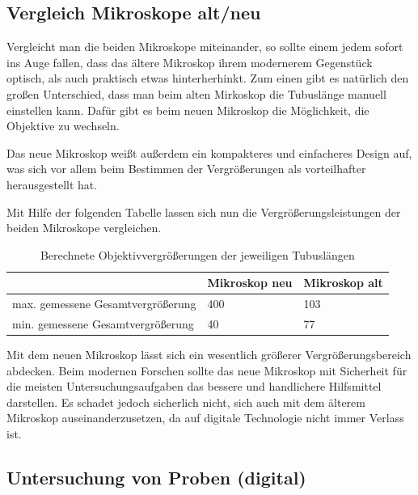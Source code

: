 \documentclass[12pt,a4paper,twoside]{article}
\begin{document}
\subsection{Vergleich Mikroskope alt/neu}

Vergleicht man die beiden Mikroskope miteinander, so sollte einem jedem sofort ins Auge fallen, dass das ältere Mikroskop ihrem modernerem Gegenstück optisch, als auch praktisch etwas hinterherhinkt.
Zum einen gibt es natürlich den großen Unterschied, dass man beim alten Mirkoskop die Tubuslänge manuell einstellen kann. Dafür gibt es beim neuen Mikroskop die Möglichkeit, die Objektive zu wechseln. \newline

\noindent
Das neue Mikroskop weißt außerdem ein kompakteres und einfacheres Design auf, was sich vor allem beim Bestimmen der Vergrößerungen als vorteilhafter herausgestellt hat. \newline

\noindent
Mit Hilfe der folgenden Tabelle lassen sich nun die Vergrößerungsleistungen der beiden Mikroskope vergleichen.

\begin{table}[H]
    \centering
    \caption{Berechnete Objektivvergrößerungen der jeweiligen Tubuslängen}
    \label{tab:GesamtvergrößerungenNMberechnet}
    \begin{tabular}{| l | l | l |}
        \hline
           & Mikroskop neu & Mikroskop alt \\
        \hline
        max. gemessene Gesamtvergrößerung & 400 & 103 \\
        min. gemessene Gesamtvergrößerung & 40 & 77 \\
        \hline
    \end{tabular}
\end{table}

\noindent
Mit dem neuen Mikroskop lässt sich ein wesentlich größerer Vergrößerungsbereich abdecken. 
Beim modernen Forschen sollte das neue Mikroskop mit Sicherheit für die meisten Untersuchungsaufgaben das bessere und handlichere Hilfsmittel darstellen.
Es schadet jedoch sicherlich nicht, sich auch mit dem älterem Mikroskop auseinanderzusetzen, da auf digitale Technologie nicht immer Verlass ist.


\subsection{Untersuchung von Proben (digital)}
\end{document}
